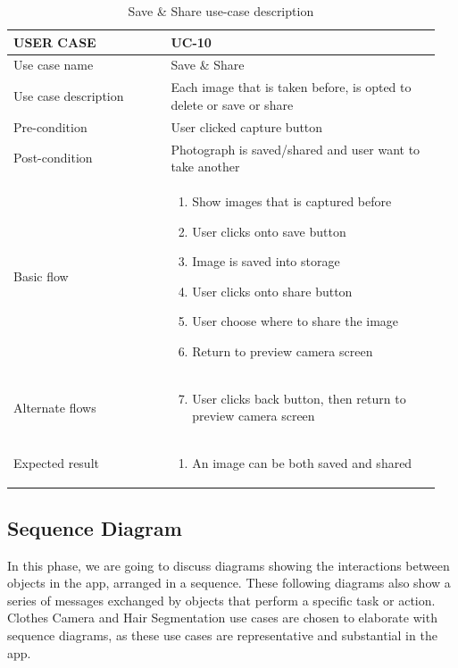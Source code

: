 \begin{center} 
\begin{table} [H]
\caption{Save \& Share use-case description} 
\begin{tabular}{p{0.35\linewidth} | p{0.6\linewidth}}
\hline
USER CASE            & UC-10 \\ \hline
Use case name        &  Save \& Share  \\ \hline
Use case description &   Each image that is taken before, is opted to delete or save or share   \\\hline
Pre-condition         &   User clicked capture button   \\ \hline
Post-condition        &  Photograph is saved/shared and user want to take another    \\ \hline
Basic flow           &   \begin{enumerate}

    \item Show images that is captured before
    \item User clicks onto save button
    \item Image is saved into storage
    \item User clicks onto share button
    \item User choose where to share the image
    \item Return to preview camera screen
\end{enumerate}   \\ \hline
Alternate flows      &  \begin{enumerate}
    \setcounter{enumi}{6}
    \item User clicks back button, then return to preview camera screen
\end{enumerate}    \\ \hline
Expected result      &   
\begin{enumerate}
    \item An image can be both saved and shared
\end{enumerate}  \\ \hline
\end{tabular}
\end{table}
\end{center}

\subsection{Sequence Diagram}

In this phase, we are going to discuss diagrams showing the interactions between objects in the app, arranged
in a sequence. These following diagrams also show a series of messages exchanged by objects that perform a specific task or action. Clothes Camera and Hair Segmentation use cases are chosen to elaborate with sequence diagrams, as these use cases are representative and substantial in the app.  

